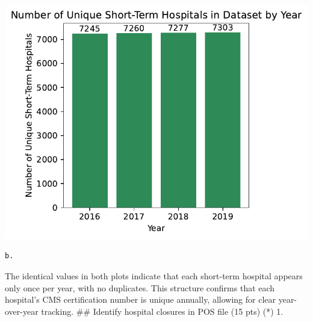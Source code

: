 \documentclass[
  letterpaper,
  DIV=11,
  numbers=noendperiod]{scrartcl}
\begin{document}
\includegraphics{pset4_template_files/figure-pdf/cell-4-output-1.pdf}

\begin{verbatim}
b. 
\end{verbatim}

The identical values in both plots indicate that each short-term
hospital appears only once per year, with no duplicates. This structure
confirms that each hospital's CMS certification number is unique
annually, allowing for clear year-over-year tracking. \#\# Identify
hospital closures in POS file (15 pts) (*) 1.
\end{document}
